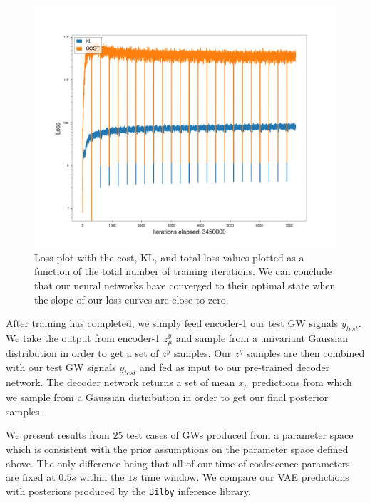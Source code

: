 \documentclass[%
showpacs,
 amsmath,amssymb,
 aps,
 twocolumn,
 prl,
 reprint,
floatfix,
]{revtex4-1}
\begin{document}
%
%
\begin{figure}
    \includegraphics[width=\columnwidth]{images/losses_logscale.png}
    \caption{\label{fig:loss_log} Loss plot with the cost, KL, 
    and total loss values plotted as a function of the total 
    number of training iterations. We can conclude that our 
    neural networks have converged to their optimal state 
    when the slope of our loss curves are close to zero.}
\end{figure}

%
%
After training has completed, we simply feed encoder-1 our test 
GW signals $y_{test}$. We take the output from encoder-1 $z^{y}_{\mu}$ 
and sample from a univariant Gaussian distribution in order to get 
a set of $z^{y}$ samples. Our $z^{y}$ samples are then combined with our 
test GW signals $y_{test}$ and fed as input to our pre-trained decoder 
network. The decoder network returns a set of mean $x_{\mu}$ predictions 
from which we sample from a Gaussian distribution in order to get 
our final posterior samples.

%
%
We present results from $25$ test cases of GWs produced from 
a parameter space which is consistent with the prior assumptions  
on the parameter space defined above. The only difference 
being that all of our time of coalescence parameters are fixed 
at $0.5s$ within the $1s$ time window. We compare our 
VAE predictions with posteriors produced by the \texttt{Bilby}
inference library.
\end{document}

